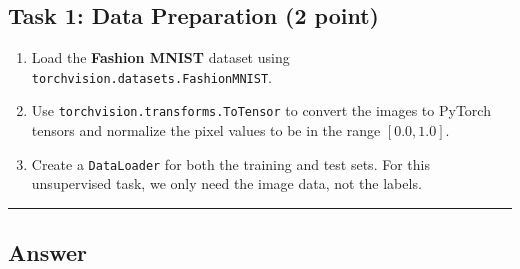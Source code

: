 \documentclass[
  letterpaper,
  DIV=11,
  numbers=noendperiod]{scrartcl}
\providecommand{\tightlist}{%
  \setlength{\itemsep}{0pt}\setlength{\parskip}{0pt}}\usepackage{longtable,booktabs,array}
\begin{document}
\subsection{Task 1: Data Preparation (2
point)}\label{task-1-data-preparation-2-point}

\begin{enumerate}
\def\labelenumi{\arabic{enumi}.}
\tightlist
\item
  Load the \textbf{Fashion MNIST} dataset using
  \texttt{torchvision.datasets.FashionMNIST}.
\item
  Use \texttt{torchvision.transforms.ToTensor} to convert the images to
  PyTorch tensors and normalize the pixel values to be in the range
  \([0.0, 1.0]\).
\item
  Create a \texttt{DataLoader} for both the training and test sets. For
  this unsupervised task, we only need the image data, not the labels.
\end{enumerate}

\begin{center}\rule{0.5\linewidth}{0.5pt}\end{center}

\subsection{Answer}\label{answer-3}
\end{document}
